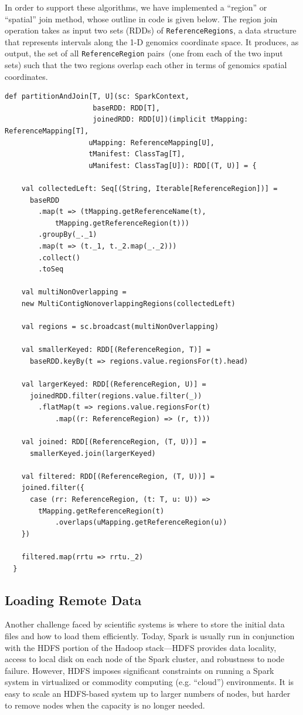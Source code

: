 \documentclass{acm_proc_article-sp}
\begin{document}
In order to support these algorithms, we have implemented a ``region'' or ``spatial'' join  method, whose
outline in code is given below. The region join operation takes as input two sets (RDDs) of
\texttt{ReferenceRegions}, a data structure that represents intervals along the 1-D genomics coordinate
space. It produces, as output, the set of all \texttt{ReferenceRegion} pairs~(one from each of the two
input sets) such that the two regions overlap each other in terms of genomics spatial coordinates. 

\begin{lstlisting}
def partitionAndJoin[T, U](sc: SparkContext,
					 baseRDD: RDD[T],
					 joinedRDD: RDD[U])(implicit tMapping: ReferenceMapping[T],
					uMapping: ReferenceMapping[U],
					tManifest: ClassTag[T],
					uManifest: ClassTag[U]): RDD[(T, U)] = {

    val collectedLeft: Seq[(String, Iterable[ReferenceRegion])] =
      baseRDD
        .map(t => (tMapping.getReferenceName(t), 
			tMapping.getReferenceRegion(t))) 
        .groupBy(_._1) 
        .map(t => (t._1, t._2.map(_._2))) 
        .collect() 
        .toSeq 

    val multiNonOverlapping = 
	new MultiContigNonoverlappingRegions(collectedLeft)

    val regions = sc.broadcast(multiNonOverlapping)

    val smallerKeyed: RDD[(ReferenceRegion, T)] =
      baseRDD.keyBy(t => regions.value.regionsFor(t).head)

    val largerKeyed: RDD[(ReferenceRegion, U)] =
      joinedRDD.filter(regions.value.filter(_))
        .flatMap(t => regions.value.regionsFor(t)
			.map((r: ReferenceRegion) => (r, t)))

    val joined: RDD[(ReferenceRegion, (T, U))] =
      smallerKeyed.join(largerKeyed)

    val filtered: RDD[(ReferenceRegion, (T, U))] = 
	joined.filter({
	  case (rr: ReferenceRegion, (t: T, u: U)) =>
		tMapping.getReferenceRegion(t)
			.overlaps(uMapping.getReferenceRegion(u))
	})

    filtered.map(rrtu => rrtu._2)
  }
\end{lstlisting}

\subsection{Loading Remote Data}
\label{sec:loading-remote-data}

Another challenge faced by scientific systems is where to store the initial data files and how to load them
efficiently. Today, Spark is usually run in conjunction with the HDFS portion of the Hadoop stack---HDFS
provides data locality, access to local disk on each node of the Spark cluster, and robustness to node
failure. However, HDFS imposes significant constraints on running a Spark system in virtualized or
commodity computing (e.g. ``cloud'') environments.  It is easy to scale an HDFS-based system up to
larger numbers of nodes, but harder to remove nodes when the capacity is no longer needed.  
\end{document}
